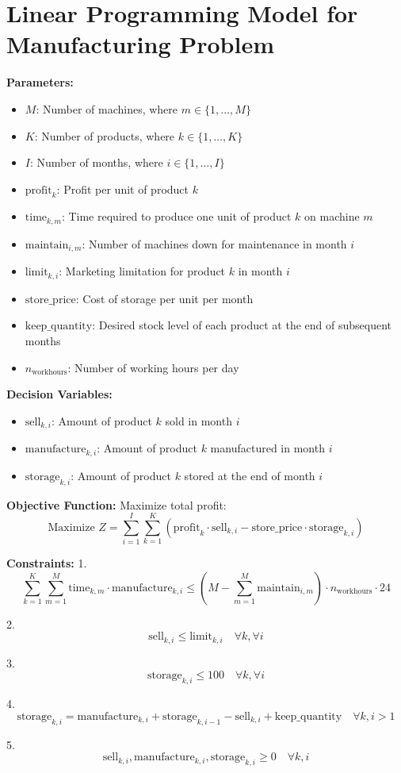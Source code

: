 \documentclass{article}
\begin{document}
\section*{Linear Programming Model for Manufacturing Problem}

\textbf{Parameters:}
\begin{itemize}
    \item $M$: Number of machines, where $m \in \{1, \ldots, M\}$
    \item $K$: Number of products, where $k \in \{1, \ldots, K\}$
    \item $I$: Number of months, where $i \in \{1, \ldots, I\}$
    \item $\text{profit}_k$: Profit per unit of product $k$
    \item $\text{time}_{k,m}$: Time required to produce one unit of product $k$ on machine $m$
    \item $\text{maintain}_{i,m}$: Number of machines down for maintenance in month $i$
    \item $\text{limit}_{k,i}$: Marketing limitation for product $k$ in month $i$
    \item $\text{store\_price}$: Cost of storage per unit per month
    \item $\text{keep\_quantity}$: Desired stock level of each product at the end of subsequent months
    \item $n_{\text{workhours}}$: Number of working hours per day
\end{itemize}

\textbf{Decision Variables:}
\begin{itemize}
    \item $\text{sell}_{k,i}$: Amount of product $k$ sold in month $i$
    \item $\text{manufacture}_{k,i}$: Amount of product $k$ manufactured in month $i$
    \item $\text{storage}_{k,i}$: Amount of product $k$ stored at the end of month $i$
\end{itemize}

\textbf{Objective Function:}
Maximize total profit:
\[
\text{Maximize } Z = \sum_{i=1}^{I} \sum_{k=1}^{K} \left( \text{profit}_k \cdot \text{sell}_{k,i} - \text{store\_price} \cdot \text{storage}_{k,i} \right)
\]

\textbf{Constraints:}
1. 
\[
\sum_{k=1}^{K} \sum_{m=1}^{M} \text{time}_{k,m} \cdot \text{manufacture}_{k,i} \leq (M - \sum_{m=1}^{M} \text{maintain}_{i,m}) \cdot n_{\text{workhours}} \cdot 24
\]

2. 
\[
\text{sell}_{k,i} \leq \text{limit}_{k,i} \quad \forall k, \forall i
\]

3. 
\[
\text{storage}_{k,i} \leq 100 \quad \forall k, \forall i
\]

4. 
\[
\text{storage}_{k,i} = \text{manufacture}_{k,i} + \text{storage}_{k,i-1} - \text{sell}_{k,i} + \text{keep\_quantity} \quad \forall k, i>1
\]

5. 
\[
\text{sell}_{k,i}, \text{manufacture}_{k,i}, \text{storage}_{k,i} \geq 0 \quad \forall k, i
\]
\end{document}
